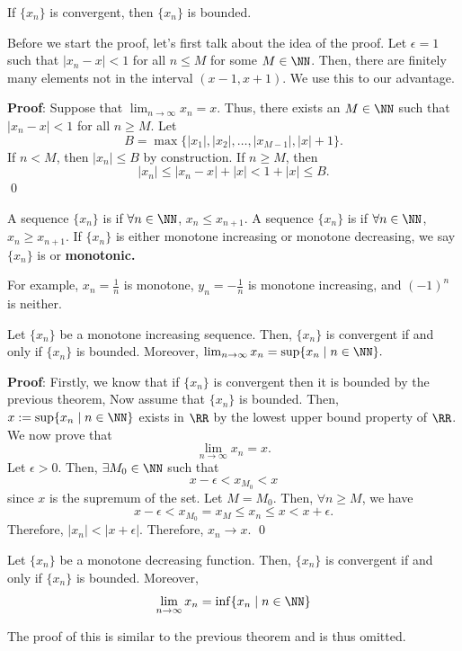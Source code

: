 \begin{theorem}
If $\{x_n\}$ is convergent, then $\{x_n\}$ is bounded.
\end{theorem}
Before we start the proof, let's first talk about the idea of the proof. Let $\epsilon = 1$ such that $|x_n-x|<1$ for all $n\leq M$ for some $M\in \NN$. Then, there are finitely many elements not in the interval $(x-1,x+1)$. We use this to our advantage.

\textbf{Proof}: Suppose that $\lim_{n\to \infty}x_n = x$. Thus, there exists an $M\in\NN$ such that $|x_n-x|<1$ for all $n\geq M$. Let 
\[
B = \max\{|x_1|, |x_2|,\dots, |x_{M-1}|, |x|+1\}.
\]
If $n <M$, then $|x_n| \leq B$ by construction. If $n\geq M$, then \[
|x_n| \leq |x_n-x| + |x| <1+|x| \leq B.
\] \qed 

\begin{definition}[Monotone]
A sequence $\{x_n\}$ is  if $\forall n\in \NN$, $x_{n}\leq x_{n+1}$. A sequence $\{x_n\}$ is  if $\forall n\in \NN$, $x_n \geq x_{n+1}$. If $\{x_n\}$ is either monotone increasing or monotone decreasing, we say $\{x_n\}$ is  or \textbf{monotonic.}
\end{definition}

\begin{example}
For example, $x_n =\frac{1}{n}$ is monotone, $y_n = -\frac{1}{n}$ is monotone increasing, and $(-1)^n$ is neither.
\end{example}

\begin{theorem}
Let $\{x_n\}$ be a monotone increasing sequence. Then, $\{x_n\}$ is convergent if and only if $\{x_n\}$ is bounded. Moreover, $\lim_{n\to \infty}x_n = \sup\{x_n \mid n\in \NN\}.$
\end{theorem}
\textbf{Proof}: Firstly, we know that if $\{x_n\}$ is convergent then it is bounded by the previous theorem, Now assume that $\{x_n\}$ is bounded. Then, $x:= \sup\{x_n \mid n\in \NN\}$ exists in $\RR$ by the lowest upper bound property of $\RR$. We now prove that 
\[
\lim_{n\to \infty}x_n = x.
\]
Let $\epsilon>0$. Then, $\exists M_0\in \NN$ such that 
\[
x-\epsilon < x_{M_0}<x
\]
since $x$ is the supremum of the set. Let $M = M_0$. Then, $\forall n\geq M$, we have 
\[
x-\epsilon < x_{M_0} = x_M \leq x_n \leq x < x+\epsilon.
\]
Therefore, $|x_n|< |x+\epsilon|$. Therefore, $x_n \to x$. \qed 

\begin{theorem}
Let $\{x_n\}$ be a monotone decreasing function. Then, $\{x_n\}$ is convergent if and only if $\{x_n\}$ is bounded. Moreover, 
\[
\lim_{n\to \infty} x_n = \inf\{x_n \mid n\in \NN\} 
\]
\end{theorem}
The proof of this is similar to the previous theorem and is thus omitted.


